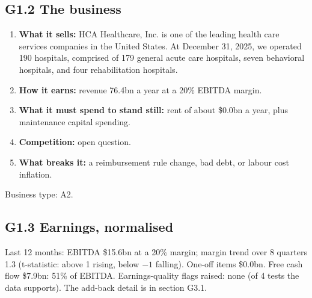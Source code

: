 \documentclass[11pt,a4paper]{article}
\begin{document}
\subsection*{G1.2 The business}
\begin{enumerate}
\item \textbf{What it sells:} HCA Healthcare, Inc. is one of the leading health care services companies in the United States. At December 31, 2025, we operated 190 hospitals, comprised of 179 general acute care hospitals, seven behavioral hospitals, and four rehabilitation hospitals.
\item \textbf{How it earns:} revenue 76.4bn a year at a 20\% EBITDA margin.
\item \textbf{What it must spend to stand still:} rent of about \$0.0bn a year, plus maintenance capital spending.
\item \textbf{Competition:} open question.
\item \textbf{What breaks it:} a reimbursement rule change, bad debt, or labour cost inflation.
\end{enumerate}
Business type: A2.
\subsection*{G1.3 Earnings, normalised}
Last 12 months: EBITDA \$15.6bn at a 20\% margin; margin trend over 8 quarters 1.3 (t-statistic: above 1 rising, below $-1$ falling). One-off items \$0.0bn. Free cash flow \$7.9bn: 51\% of EBITDA. Earnings-quality flags raised: none (of 4 tests the data supports). The add-back detail is in section G3.1.
\end{document}
